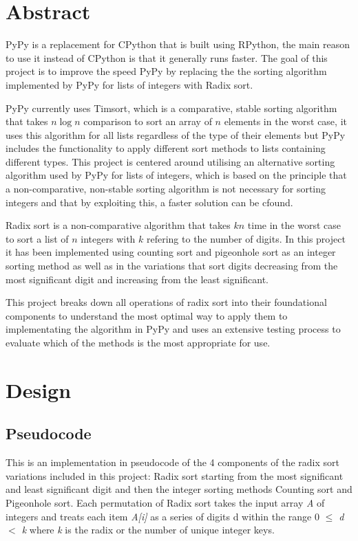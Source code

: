 \documentclass[12pt]{article}
\begin{document}
{
  \hypersetup{linkcolor=black}
  \tableofcontents
}
\newcommand{\myparagraph}[1]{\paragraph{#1}\mbox{}\\}
\pagebreak
\section{Abstract}
PyPy is a replacement for CPython that is built using RPython, the main reason to use it instead of CPython is that it generally runs faster. The goal of this project is to improve the speed PyPy by replacing the the sorting algorithm implemented by PyPy for lists of integers with Radix sort.
\par
PyPy currently uses Timsort, which is a comparative, stable sorting algorithm that takes $n\log{n}$ comparison to sort an array of $n$ elements in the worst case, it uses this algorithm for all lists regardless of the type of their elements but PyPy includes the functionality to apply different sort methods to lists containing different types. This project is centered around utilising an alternative sorting algorithm used by PyPy for lists of integers, which is based on the principle that a non-comparative, non-stable sorting algorithm is not necessary for sorting integers and that by exploiting this, a faster solution can be cfound. 
\par
Radix sort is a non-comparative algorithm that takes $kn$ time in the worst case to sort a list of $n$ integers with $k$ refering to the number of digits. In this project it has been implemented using counting sort and pigeonhole sort as an integer sorting method as well as in the variations that sort digits decreasing from the most significant digit and increasing from the least significant.
\par
This project breaks down all operations of radix sort into their foundational components to understand the most optimal way to apply them to implementating the algorithm in PyPy and uses an extensive testing process to evaluate which of the methods is the most appropriate for use.
\pagebreak

\section{Design}
\label{sec:design}
	\subsection{Pseudocode}
	This is an implementation in pseudocode of the 4 components of the radix sort variations included in this project: Radix sort starting from the most significant and least significant digit and then the integer sorting methods Counting sort and Pigeonhole sort. Each permutation of Radix sort takes the input array \textit{A} of integers and treats each item \textit{A[i]} as a series of digits d within the range 0 \textit{$\leq$ d $<$ k} where \textit{k} is the radix or the number of unique integer keys. 
\end{document}
